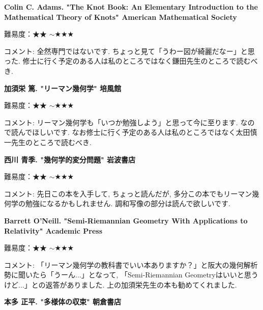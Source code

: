 \textbf{Colin C. Adams. "The Knot Book: An Elementary Introduction to the Mathematical Theory of Knots" American Mathematical Society}  　\vspace{-6pt} 

難易度：★★ $\sim$★★★\vspace{-6pt} 

コメント: 全然専門ではないです. ちょっと見て「うわー図が綺麗だなー」と思った. 修士に行く予定のある人は私のところではなく鎌田先生のところで読むべき. 
\vspace{8pt}

\textbf{加須栄 篤. "リーマン幾何学" 培風館}  　\vspace{-6pt} 

難易度：★★ $\sim$★★★\vspace{-6pt} 

コメント: リーマン幾何学も「いつか勉強しよう」と思って今に至ります. なので読んでほしいです. 
なお修士に行く予定のある人は私のところではなく太田慎一先生のところで読むべき.

\vspace{8pt}

\textbf{西川 青季. "幾何学的変分問題" 岩波書店}　\vspace{-6pt} 

難易度：★★ $\sim$★★★　\vspace{-6pt} 

コメント: 先日この本を入手して, ちょっと読んだが, 多分この本でもリーマン幾何学の勉強になるかもしれません. 
調和写像の部分は読んで欲しいです. 
\vspace{8pt}


\textbf{Barrett O'Neill. "Semi-Riemannian Geometry With Applications to Relativity" Academic Press}  　\vspace{-6pt} 

難易度：★★ $\sim$★★★\vspace{-6pt} 

コメント: 「リーマン幾何学の教科書でいい本ありますか？」と阪大の幾何解析勢に聞いたら「うーん...」となって, 「Semi-Riemannian Geometryはいいと思うけど...」との返答がありました. 上の加須栄先生の本も勧めてくれました.

\vspace{8pt}

\textbf{本多 正平. "多様体の収束" 朝倉書店}  　\vspace{-6pt} 


